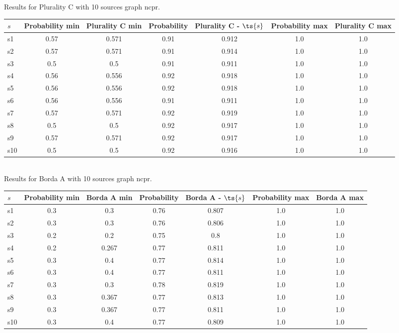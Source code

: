 \documentclass{article}
\begin{document}
\noindent Results for Plurality C with 10 sources graph ncpr.

\noindent\begin{tabular}{|l|c|c|c|c|c|c|}
\hline
$s$& Probability min & Plurality C min & Probability & Plurality C - $\ts{s}$ & Probability max & Plurality C max\\
\hline
s1 &0.57 & 0.571 & 0.91 & 0.912 & 1.0 & 1.0\\
\hline
s2 &0.57 & 0.571 & 0.91 & 0.914 & 1.0 & 1.0\\
\hline
s3 &0.5 & 0.5 & 0.91 & 0.911 & 1.0 & 1.0\\
\hline
s4 &0.56 & 0.556 & 0.92 & 0.918 & 1.0 & 1.0\\
\hline
s5 &0.56 & 0.556 & 0.92 & 0.918 & 1.0 & 1.0\\
\hline
s6 &0.56 & 0.556 & 0.91 & 0.911 & 1.0 & 1.0\\
\hline
s7 &0.57 & 0.571 & 0.92 & 0.919 & 1.0 & 1.0\\
\hline
s8 &0.5 & 0.5 & 0.92 & 0.917 & 1.0 & 1.0\\
\hline
s9 &0.57 & 0.571 & 0.92 & 0.917 & 1.0 & 1.0\\
\hline
s10 &0.5 & 0.5 & 0.92 & 0.916 & 1.0 & 1.0\\
\hline
\end{tabular}\\

\noindent Results for Borda A with 10 sources graph ncpr.

\noindent\begin{tabular}{|l|c|c|c|c|c|c|}
\hline
$s$& Probability min & Borda A min & Probability & Borda A - $\ts{s}$ & Probability max & Borda A max\\
\hline
s1 &0.3 & 0.3 & 0.76 & 0.807 & 1.0 & 1.0\\
\hline
s2 &0.3 & 0.3 & 0.76 & 0.806 & 1.0 & 1.0\\
\hline
s3 &0.2 & 0.2 & 0.75 & 0.8 & 1.0 & 1.0\\
\hline
s4 &0.2 & 0.267 & 0.77 & 0.811 & 1.0 & 1.0\\
\hline
s5 &0.3 & 0.4 & 0.77 & 0.814 & 1.0 & 1.0\\
\hline
s6 &0.3 & 0.4 & 0.77 & 0.811 & 1.0 & 1.0\\
\hline
s7 &0.3 & 0.3 & 0.78 & 0.819 & 1.0 & 1.0\\
\hline
s8 &0.3 & 0.367 & 0.77 & 0.813 & 1.0 & 1.0\\
\hline
s9 &0.3 & 0.367 & 0.77 & 0.811 & 1.0 & 1.0\\
\hline
s10 &0.3 & 0.4 & 0.77 & 0.809 & 1.0 & 1.0\\
\hline
\end{tabular}\\
\end{document}
